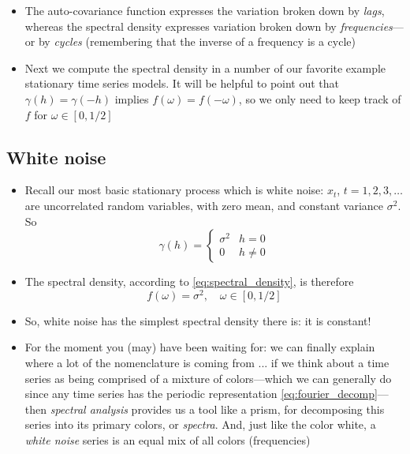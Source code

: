 \documentclass{article}
\begin{document}
\begin{itemize}
\item The auto-covariance function expresses the variation broken down by
  \emph{lags}, whereas the spectral density expresses variation broken down by
  \emph{frequencies}---or by \emph{cycles} (remembering that the inverse of a
  frequency is a cycle)  

\item Next we compute the spectral density in a number of our favorite example
  stationary time series models. It will be helpful to point out that $\gamma(h)
  = \gamma(-h)$ implies $f(\omega) = f(-\omega)$, so we only need to keep track
  of $f$ for $\omega \in [0, 1/2]$ 
\end{itemize}

\subsection{White noise}

\begin{itemize}
\item Recall our most basic stationary process which is white noise: $x_t$, $t = 
  1,2,3,\dots$ are uncorrelated random variables, with zero mean, and constant 
  variance $\sigma^2$. So
  \[
  \gamma(h) = \begin{cases} 
    \sigma^2 & h = 0 \\
    0 & h \not= 0
  \end{cases}
  \]
 
\item The spectral density, according to \eqref{eq:spectral_density}, is
  therefore
  \[
  f(\omega) = \sigma^2, \quad \omega \in [0, 1/2]
  \]

\item So, white noise has the simplest spectral density there is: it is constant! 

\item For the moment you (may) have been waiting for: we can finally explain
  where a lot of the nomenclature is coming from ... if we think about a time
  series as being comprised of a mixture of colors---which we can generally do
  since any time series has the periodic representation
  \eqref{eq:fourier_decomp}---then \emph{spectral analysis} provides us a tool
  like a prism, for decomposing this series into its primary colors, or
  \emph{spectra}. And, just like the color white, a \emph{white noise} series is
  an equal mix of all colors (frequencies)
\end{itemize}
\end{document}
